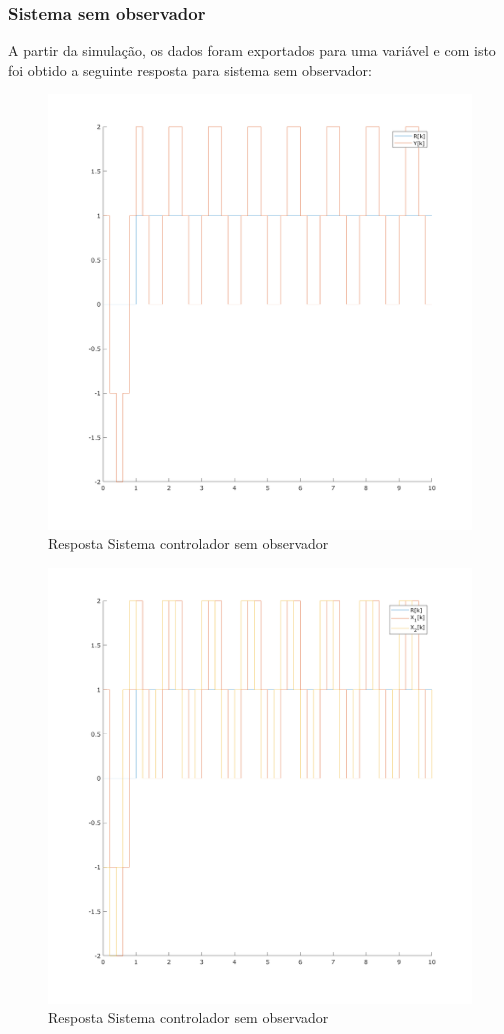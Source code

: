 \documentclass[a4paper,11pt]{article}
\begin{document}
\subsubsection{Sistema sem observador}

A partir da simulação, os dados foram exportados para uma variável e com isto foi obtido a seguinte resposta para sistema sem observador:

\begin{figure}[H]
    \centering
    \includegraphics[width=0.9\linewidth]{img/exsim6-ss-sim.png}
    \caption{Resposta Sistema controlador sem observador}
    \label{fig:e6-ss-sim}
\end{figure}

\begin{figure}[H]
    \centering
    \includegraphics[width=0.9\linewidth]{img/exsim6-ss-state-sim.png}
    \caption{Resposta Sistema controlador sem observador}
    \label{fig:e6-ss-state-sim}
\end{figure}
\end{document}
